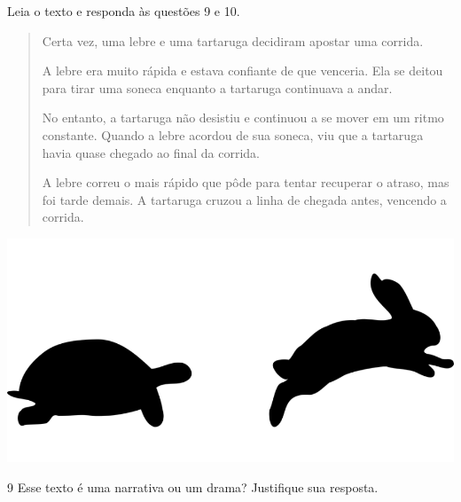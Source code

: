 
\bigskip\bigskip\bigskip

Leia o texto e responda às questões 9 e 10.\medskip

\begin{minipage}{.5\textwidth}
\begin{quote}
Certa vez, uma lebre e uma tartaruga decidiram apostar uma corrida.

A lebre era muito rápida e estava confiante de que venceria. Ela se
deitou para tirar uma soneca enquanto a tartaruga continuava a andar.

No entanto, a tartaruga não desistiu e continuou a se mover em um ritmo
constante. Quando a lebre acordou de sua soneca, viu que a tartaruga
havia quase chegado ao final da corrida.

A lebre correu o mais rápido que pôde para tentar recuperar o atraso,
mas foi tarde demais. A tartaruga cruzou a linha de chegada antes,
vencendo a corrida.

\end{quote}

\end{minipage}
\begin{minipage}{.5\textwidth}
\includegraphics[width=\textwidth]{./imgs/img6.png}
\end{minipage}

\bigskip\bigskip\bigskip
\num{9} Esse texto é uma narrativa ou um drama? Justifique sua resposta.


